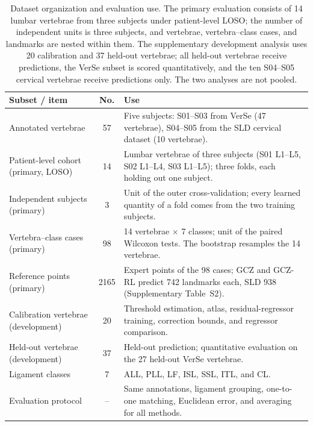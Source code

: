 \documentclass[5p,times,twocolumn,authoryear]{elsarticle}
\newif\ifhighlight
\newcommand{\rev}[1]{\ifhighlight{\color{revcolor}#1}\else#1\fi}
\begin{document}
\begin{table}[!t]
\centering
\caption{Dataset organization and evaluation use. The primary evaluation consists of 14 lumbar vertebrae from three subjects under patient-level LOSO\rev{; the number of independent units is three subjects, and vertebrae, vertebra--class cases, and landmarks are nested within them}. The supplementary development analysis uses 20 calibration and 37 held-out vertebrae; all held-out vertebrae receive predictions, the VerSe subset is scored quantitatively, and the ten S04--S05 cervical vertebrae receive predictions only. The two analyses are not pooled.}
\label{tab:dataset}
\renewcommand{\arraystretch}{1.12}
\small
\begin{tabular}{@{}p{}cp{}@{}}
\toprule
\textbf{Subset / item} & \textbf{No.} & \textbf{Use} \\
\midrule
Annotated vertebrae & 57 & Five subjects: S01--S03 from VerSe (47 vertebrae), S04--S05 from the SLD cervical dataset (10 vertebrae). \\
Patient-level cohort (primary, LOSO) & 14 & Lumbar vertebrae of three subjects (S01 L1--L5, S02 L1--L4, S03 L1--L5); three folds, each holding out one subject. \\
\rev{Independent subjects (primary)} & \rev{3} & \rev{Unit of the outer cross-validation; every learned quantity of a fold comes from the two training subjects.} \\
\rev{Vertebra--class cases (primary)} & \rev{98} & \rev{14 vertebrae $\times$ 7 classes; unit of the paired Wilcoxon tests. The bootstrap resamples the 14 vertebrae.} \\
\rev{Reference points (primary)} & \rev{2165} & \rev{Expert points of the 98 cases; GCZ and GCZ-RL predict 742 landmarks each, SLD 938 (Supplementary Table~S2).} \\
Calibration vertebrae (development) & 20 & Threshold estimation, atlas, residual-regressor training, correction bounds, and regressor comparison. \\
Held-out vertebrae (development) & 37 & Held-out prediction; quantitative evaluation on the 27 held-out VerSe vertebrae. \\
Ligament classes & 7 & ALL, PLL, LF, ISL, SSL, ITL, and CL. \\
Evaluation protocol & -- & Same annotations, ligament grouping, one-to-one matching, Euclidean error, and averaging for all methods. \\
\bottomrule
\end{tabular}
\end{table}
\end{document}
